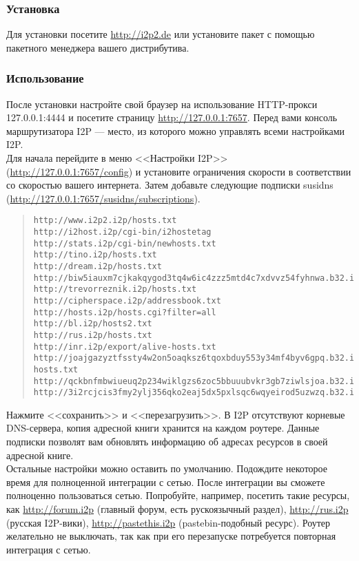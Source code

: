 \subsubsection{Установка}
Для установки посетите \url{http://i2p2.de} или установите пакет с помощью пакетного менеджера вашего дистрибутива.
\subsubsection{Использование}
После установки настройте свой браузер на использование HTTP-прокси 127.0.0.1:4444 и посетите страницу \url{http://127.0.0.1:7657}. Перед вами консоль маршрутизатора I2P --- место, из которого можно управлять всеми настройками I2P.\\
Для начала перейдите в меню <<Настройки I2P>> (\url{http://127.0.0.1:7657/config}) и установите ограничения скорости в соответствии со скоростью вашего интернета. Затем добавьте следующие подписки susidns (\url{http://127.0.0.1:7657/susidns/subscriptions}).
\scriptsize\begin{quote}\begin{verbatim}
http://www.i2p2.i2p/hosts.txt
http://i2host.i2p/cgi-bin/i2hostetag
http://stats.i2p/cgi-bin/newhosts.txt
http://tino.i2p/hosts.txt
http://dream.i2p/hosts.txt
http://biw5iauxm7cjkakqygod3tq4w6ic4zzz5mtd4c7xdvvz54fyhnwa.b32.i2p/uncensored_hosts.txt
http://trevorreznik.i2p/hosts.txt
http://cipherspace.i2p/addressbook.txt
http://hosts.i2p/hosts.cgi?filter=all
http://bl.i2p/hosts2.txt
http://rus.i2p/hosts.txt
http://inr.i2p/export/alive-hosts.txt
http://joajgazyztfssty4w2on5oaqksz6tqoxbduy553y34mf4byv6gpq.b32.i2p/export/alive-hosts.txt
http://qckbnfmbwiueuq2p234wiklgzs6zoc5bbuuubvkr3gb7ziwlsjoa.b32.i2p/list.txt
http://3i2rcjcis3fmy2ylj356qko2eaj5dx5pxlsqc6wqyeirod5uzwzq.b32.i2p/hosts.txt
\end{verbatim}\end{quote}\normalsize
Нажмите <<сохранить>> и <<перезагрузить>>. В I2P отсутствуют корневые DNS-сервера, копия адресной книги хранится на каждом роутере. Данные подписки позволят вам обновлять информацию об адресах ресурсов в своей адресной книге.\\
Остальные настройки можно оставить по умолчанию. Подождите некоторое время для полноценной интеграции с сетью. После интеграции вы сможете полноценно пользоваться сетью. Попробуйте, например, посетить такие ресурсы, как \url{http://forum.i2p} (главный форум, есть рускоязычный раздел), \url{http://rus.i2p} (русская I2P-вики), \url{http://pastethis.i2p} (pastebin-подобный ресурс). Роутер желательно не выключать, так как при его перезапуске потребуется повторная интеграция с сетью.
